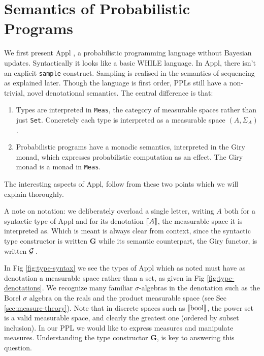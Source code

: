 
\section{Semantics of Probabilistic Programs}
\label{sec:appl}

We first present Appl \citep[appendix A]{lilac}, a probabilistic programming language without Bayesian updates. Syntactically it looks like a basic WHILE language.
In Appl, there isn't an explicit \texttt{sample} construct. Sampling is realised in the semantics of sequencing as explained later. Though the language is
first order, PPLs still have a non-trivial, novel denotational semantics. The central difference is that:
\begin{enumerate}
\item Types are interpreted in \texttt{Meas}, the category of measurable spaces rather than
just \texttt{Set}. Concretely each type is interpreted as a measurable space $(A, \Sigma_A)$.
\item Probabilistic programs have a monadic semantics, interpreted in the Giry monad, which expresses probabilistic computation as an effect. The Giry monad is a monad in \texttt{Meas}.
\end{enumerate}
The interesting aspects of Appl, follow from these two points which we will explain thoroughly.

A note on notation: we deliberately overload a single letter, writing $A$ both for a syntactic type of Appl and for its denotation $\llbracket A \rrbracket$, the measurable space it is interpreted as. Which is meant is always clear from context, since the syntactic type constructor is written $\mathbf{G}$ while its semantic counterpart, the Giry functor, is written $\mathcal{G}\,$.

In Fig \ref{fig:type-syntax} we see the types of Appl which as noted must have as denotation a measurable space rather than a set, as given in
Fig \ref{fig:type-denotations}. We recognize many familiar $\sigma$-algebras in the denotation such as the Borel $\sigma$ algebra on the reals and the product
measurable space (see Sec \ref{sec:measure-theory}). Note that in discrete spaces such as $\llbracket \mathrm{bool} \rrbracket$, the power set is a valid measurable space,
and clearly the greatest one (ordered by subset inclusion). In our PPL we would like to express
measures and manipulate measures.
Understanding the type constructor $\mathbf{G}$, is key to answering this question.

